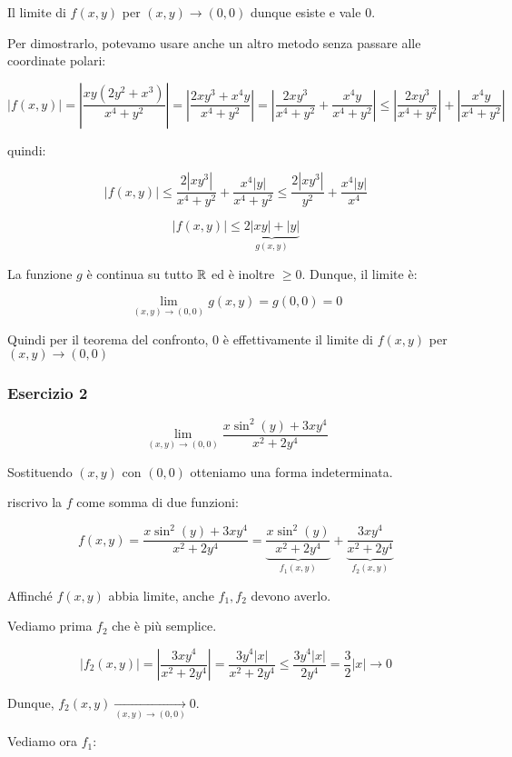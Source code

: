 Il limite di \(f(x,y)\) per \((x,y) \to (0,0)\) dunque esiste e vale \(0\).

Per dimostrarlo, potevamo usare anche un altro metodo senza passare alle coordinate polari:

\[
    \left|f(x,y)\right| =  \left|\frac{xy(2y^{2}+x^{3})}{x^{4}+y^{2}}\right| = \left|\frac{2xy^{3}+x^{4}y}{x^{4}+y^{2}}\right| = \left| \frac{2xy^{3}}{x^{4}+y^{2}}+ \frac{x^{4}y}{x^{4}+y^{2}}\right| \le \left|\frac{2xy^{3}}{x^{4}+y^{2}}\right|+ \left|\frac{x^{4}y}{x^{4}+y^{2}}\right|
\]

quindi:

\[
    |f(x,y)|  \le \frac{2|xy^{3}|}{x^{4}+y^{2}} + \frac{x^{4}|y|}{x^{4}+y^{2}} \le \frac{2|xy^{3}|}{y^{2}} + \frac{x^{4}|y|}{x^{4}}
\]

\[
    |f(x,y)|  \le \underbrace{2 |xy| + |y|}_{g(x,y)}
\]

La funzione \(g\) è continua su tutto \(\mathbb{R} \) ed è inoltre \(\ge 0\). Dunque, il limite è:

\[
    \lim_{ (x,y) \to (0,0) } g(x,y) = g(0,0) = 0
\]

Quindi per il teorema del confronto, 0 è effettivamente il limite di \(f(x,y)\) per \((x,y) \to (0,0)\)

\filbreak{}
\subsubsection*{Esercizio 2}

\[
    \lim_{ (x,y) \to (0,0) } \frac{x\sin^{2}(y)+ 3xy^{4}}{x^{2}+2y^{4}}
\]

Sostituendo \((x,y)\) con \((0,0)\) otteniamo una forma indeterminata.

riscrivo la \(f\) come somma di due funzioni:

\[
    f(x,y) = \frac{x\sin^{2}(y)+ 3xy^{4}}{x^{2}+2y^{4}}  = \underbrace{\frac{x\sin^{2}(y)}{x^{2}+2y^{4}}}_{f_1(x,y)} + \underbrace{\frac{3xy^{4}}{x^{2}+2y^{4}}}_{f_2(x,y)}
\]

Affinché \(f(x,y)\) abbia limite, anche \(f_1, f_2\) devono averlo.

Vediamo prima \(f_2\) che è più semplice.

\[
    |f_2(x,y)| = \left| \frac{3xy^{4}}{x^{2}+2y^{4}}\right| =\frac{3y^{4}|x|}{x^{2}+2y^{4}} \le \frac{3y^{4}|x|}{2y^{4}} = \frac{3}{2}|x| \rightarrow 0
\]

Dunque, \(f_2(x,y) \xrightarrow[(x,y) \to (0,0)]{} 0\).

Vediamo ora \(f_1\):

